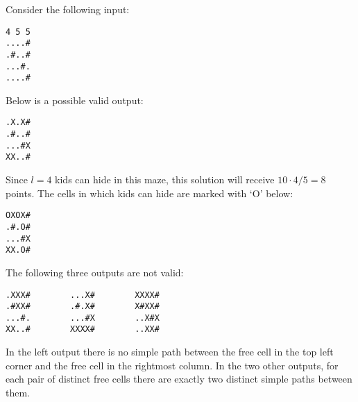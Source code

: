 Consider the following input:

\begin{verbatim}
4 5 5
....#
.#..#
...#.
....#
\end{verbatim}


Below is a possible valid output:

\begin{verbatim}
.X.X#
.#..#
...#X
XX..#
\end{verbatim}

Since $l = 4$ kids can hide in this maze, this solution will receive $10 \cdot 4 / 5 = 8$ points. The cells in which kids can hide are marked with `O' below:


\begin{verbatim}
OXOX#
.#.O#
...#X
XX.O#
\end{verbatim}

The following three outputs are not valid:

\begin{verbatim}
.XXX#        ...X#        XXXX#
.#XX#        .#.X#        X#XX#
...#.        ...#X        ..X#X
XX..#        XXXX#        ..XX#
\end{verbatim}

In the left output there is no simple path between the free cell in the top left corner and the free cell in the rightmost column. In the two other outputs, for each pair of distinct free cells there are exactly two distinct simple paths between them.